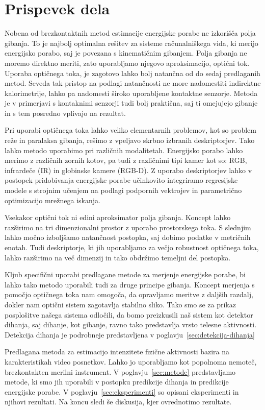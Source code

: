 \section{Prispevek dela}
Nobena od brezkontaktnih metod estimacije energijske porabe ne izkorišča polja gibanja. To je najbolj optimalna rešitev za sisteme računalniškega vida, ki merijo energijsko porabo, saj je povezana s kinematičnim gibanjem. Polja gibanja ne moremo direktno meriti, zato uporabljamo njegovo aproksimacijo, optični tok. Uporaba optičnega toka, je zagotovo lahko bolj natančna od do sedaj predlaganih metod. Seveda tak pristop na podlagi natančnosti ne more nadomestiti indirektne kalorimetrije, lahko pa nadomesti široko uporabljene kontaktne senzorje. Metoda je v primerjavi s kontaknimi senzorji tudi bolj praktična, saj ti omejujejo gibanje in s tem posredno vplivajo na rezultat. 

Pri uporabi optičnega toka lahko veliko elementarnih problemov, kot so problem reže in paralaksa gibanja, rešimo z vpeljavo skrbno izbranih deskriptorjev. Tako lahko metodo uporabimo pri različnih modalitetah. Energijsko porabo lahko merimo z različnih zornih kotov, pa tudi z različnimi tipi kamer kot so: RGB, infrardeče (IR) in globinske kamere (RGB-D). Z uporabo deskriptorjev lahko v postopek pridobivanja energijske porabe učinkovito integriramo regresijske modele s strojnim učenjem na podlagi podpornih vektrojev in parametrično optimizacijo mrežnega iskanja. 

Vsekakor optični tok ni edini aproksimator polja gibanja. Koncept lahko razširimo na tri dimenzionalni prostor z uporabo prostorskega toka. S slednjim lahko močno izboljšamo natančnost postopka, saj dobimo podatke v metričnih enotah. Tudi deskriptorje, ki jih uporabljamo za večjo robustnost optičnega toka, lahko razširimo na več dimenzij in tako obdržimo temeljni del postopka.

Kljub specifični uporabi predlagane metode za merjenje energijske porabe, bi lahko tako metodo uporabili tudi za druge principe gibanja. Koncept merjenja s pomočjo optičnega toka nam omogoča, da opravljamo meritve z daljših razdalj, dokler nam optični sistem zagotavlja stabilno sliko. Tako smo se za prikaz posplošitve našega sistema odločili, da bomo preizkusili naš sistem kot detektor dihanja, saj dihanje, kot gibanje, ravno tako predstavlja vrsto telesne aktivnosti. Detekcija dihanja je podrobneje predstavljena v poglavju~\ref{sec:detekcija-dihanja}

Predlagana metoda za estimacijo intenzitete fizične aktivnosti bazira na karakteristikah video posnetkov. Lahko jo uporabljamo kot popolnoma nemoteč, brezkontakten merilni instrument. V poglavju~\ref{sec:metode}  predstavljamo metode, ki smo jih uporabili v postopku predikcije dihanja in predikcije energijske porabe. V poglavju~\ref{sec:eksperimenti} so opisani eksperimenti in njihovi rezultati. Na koncu sledi še diskusija, kjer ovrednotimo rezultate. 